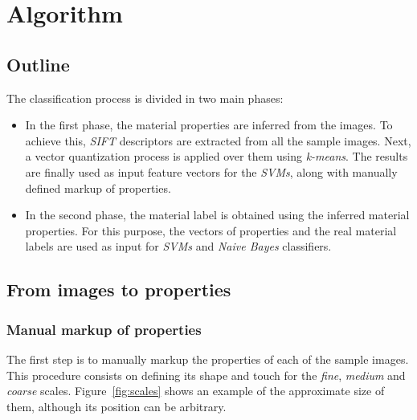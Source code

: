 
\section{Algorithm} \label{sec:algorithm}

\subsection{Outline}

The classification process is divided in two main phases:

\begin{itemize}
    \item In the first phase, the material properties are inferred from the images. To achieve this, \emph{SIFT} descriptors are extracted from all the sample images. Next, a vector quantization process is applied over them using \emph{k-means}. The results are finally used as input feature vectors for the \emph{SVMs}, along with manually defined markup of properties.

    \item In the second phase, the material label is obtained using the inferred material properties. For this purpose, the vectors of properties and the real material labels are used as input for \emph{SVMs} and \emph{Naive Bayes} classifiers.
\end{itemize}


\subsection{From images to properties}

\subsubsection{Manual markup of properties}

The first step is to manually markup the properties of each of the sample images. This procedure consists on defining its shape and touch for the \emph{fine}, \emph{medium} and \emph{coarse} scales. Figure~\ref{fig:scales} shows an example of the approximate size of them, although its position can be arbitrary.

